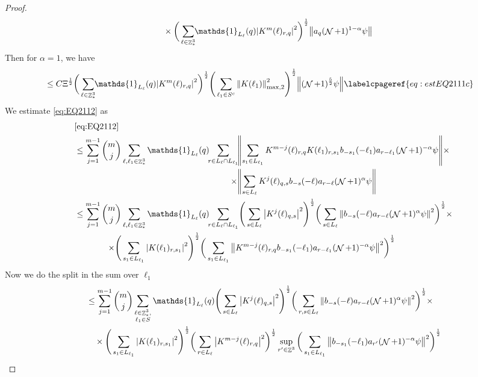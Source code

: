 \documentclass[12pt,a4paper]{article}
\numberwithin{equation}{section}
\newcommand{\1}{\mathbb{I}}
\DeclareMathOperator{\Z}{\mathbb{Z}}
\DeclareMathOperator{\NN}{\mathcal{N}}
\newcommand{\half}{\frac{1}{2}}
\newcommand{\normmaxii}[1]{\norm{#1}_{\mathrm{max,2}}}
\theoremstyle{plain}
\theoremstyle{definition}
\theoremstyle{remark}
\theoremstyle{plain}
\theoremstyle{definition}
\theoremstyle{remark}
\begin{document}
\begin{proof}
\begin{align}
		&\quad \times \bigg(\sum\limits_{\ell \in \Z^3_*} \!\!\mathds{1}_{L_\ell}(q)\abs{  K^{m}(\ell)_{r,q}}^2\bigg)^\half \norm{a_{q} (\NN+1)^{1-\alpha}\psi } \nonumber\\
	\end{align}
	Then for $\alpha = 1$, we have 
	\begin{align}
		&\leq C \Xi^{\half}\bigg(\sum\limits_{\ell \in \Z^3_*} \!\!\mathds{1}_{L_\ell}(q)\abs{  K^{m}(\ell)_{r,q}}^2\bigg)^\half \Bigg( \sum\limits_{ \ell_1 \in S^c}    \normmaxii{K(\ell_1)}^2\Bigg)^\half  \norm{    (\NN+1)^{\frac{5}{2}}\psi} \labelcpageref{eq:estEQ2111c}
	\end{align}
	We estimate \eqref{eq:EQ2112} as 
	\begin{alignat}{2}
		&\eqref{eq:EQ2112}\nonumber\\
		&\leq \sum\limits_{j=1}^{m-1} {{m}\choose j} \sum\limits_{\ell, \ell_1\in \Z^3_*} \mathds{1}_{L_{\ell}}(q)\!\! \begin{aligned}[t]
			\sum\limits_{r\in L_{\ell} \cap L_{\ell_1}}\! &\norm{  \sum\limits_{s_1 \in L_{\ell_1}} K^{m-j}(\ell)_{r,q} K(\ell_1)_{r,s_1} b_{-s_1}(-\ell_1) a_{r-\ell_1} (\NN+1)^{-\alpha}\psi}\times\nonumber \\\times &\norm{\sum\limits_{s \in L_\ell} K^{j}(\ell)_{q,s}  b_{-s}(-\ell)  a_{r-\ell} (\NN+1)^{\alpha}\psi }
		\end{aligned} \nonumber\\
		&\leq \sum\limits_{j=1}^{m-1} \begin{aligned}[t] {{m}\choose j} &\sum\limits_{\ell, \ell_1\in \Z^3_*} \mathds{1}_{L_{\ell}}(q)\!\! 
			\sum\limits_{r\in L_{\ell} \cap L_{\ell_1}}\! \Bigg( \sum\limits_{s \in L_\ell} \abs{K^{j}(\ell)_{q,s}}^2\Bigg)^\half \bigg( \sum\limits_{s \in L_\ell}\norm{  b_{-s}(-\ell) a_{r-\ell} (\NN+1)^{\alpha}\psi}^2\bigg)^\half \times\nonumber\\ \times \Bigg( &\sum\limits_{s_1 \in L_{\ell_1}}\abs{K(\ell_1)_{r,s_1}}^2\Bigg)^\half \bigg(\sum\limits_{s_1 \in L_{\ell_1}}\norm{ K^{m-j}(\ell)_{r,q}  b_{-s_1}(-\ell_1)  a_{r-\ell_1} (\NN+1)^{-\alpha}\psi }^2\bigg)^\half
		\end{aligned} \nonumber\\   
	\end{alignat}
Now we do the split in the sum over $\ell_1$
\begin{alignat}{2}
	&\leq \sum\limits_{j=1}^{m-1} {{m}\choose j} \sum\limits_{\substack{\ell \in \Z^3_*,\\\ell_1 \in S}} \mathds{1}_{L_{\ell}}(q) 
	\Bigg( \sum\limits_{s \in L_\ell} \abs{K^{j}(\ell)_{q,s}}^2\Bigg)^\half \bigg( \sum\limits_{r,s \in L_\ell}\norm{  b_{-s}(-\ell) a_{r-\ell} (\NN+1)^{\alpha}\psi}^2\bigg)^\half \times\nonumber\\ &\quad\times \Bigg( \sum\limits_{s_1 \in L_{\ell_1}}\abs{K(\ell_1)_{r,s_1}}^2\Bigg)^\half \bigg(\sum\limits_{r \in L_{\ell}}\abs{ K^{m-j}(\ell)_{r,q}  }^2\bigg)^\half \sup_{r' \in \Z^3}\bigg(\sum\limits_{s_1 \in L_{\ell_1}}\norm{ b_{-s_1}(-\ell_1)  a_{r'} (\NN+1)^{-\alpha}\psi }^2\bigg)^\half\nonumber\\ 

\end{alignat}
\end{proof}
\end{document}
